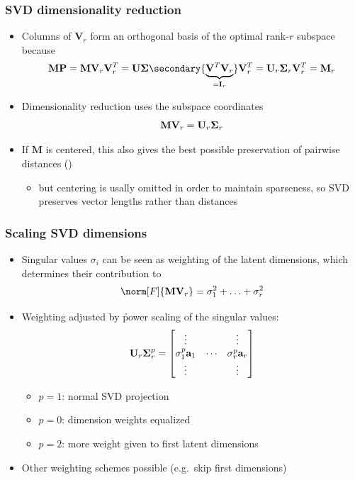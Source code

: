 \documentclass[t]{beamer} %
\begin{document}
\begin{frame}
  \frametitle{SVD dimensionality reduction}

  \begin{itemize}
  \item Columns of $\mathbf{V}_r$ form an orthogonal basis of the optimal rank-$r$ subspace because
    \[
      \mathbf{M} \mathbf{P} = \mathbf{M} \mathbf{V}_r \mathbf{V}_r^T
      = \mathbf{U} \Msigma \secondary{\underbrace{\mathbf{V}^T \mathbf{V}_r}_{= \mathbf{I}_r}} \mathbf{V}_r^T
      = \mathbf{U}_r \Msigma_r \mathbf{V}_r^T = \mathbf{M}_r
    \]
  \item<2-> \h{Dimensionality reduction} uses the subspace coordinates
    \[
      \mathbf{M} \mathbf{V}_r = \mathbf{U}_r \boldsymbol{\Sigma}_r
    \]
  \item<3-> If $\mathbf{M}$ is centered, this also gives the best possible
    preservation of pairwise distances \so {}
    ()
    \begin{itemize}
    \item[\hand] but centering is usally omitted in order to maintain sparseness,
      so SVD preserves vector lengths rather than distances
    \end{itemize}
  \end{itemize}
\end{frame}

\begin{frame}
  \frametitle{Scaling SVD dimensions}

  \begin{itemize}
  \item Singular values $\sigma_i$ can be seen as weighting of the latent
    dimensions, which determines their contribution to
    \[
      \norm[F]{\mathbf{M} \mathbf{V}_r} = \sigma_1^2 + \ldots + \sigma_r^2
    \]
  \item<2-> Weighting adjusted by \h{power scaling} of the singular values:
    \[
      \mathbf{U}_r \Msigma_r^p
      = \begin{bmatrix}
        \vdots &  & \vdots \\
        \sigma_1^p \va_1 & \cdots & \sigma_r^p \va_r \\
        \vdots &  & \vdots 
      \end{bmatrix}
    \]
    \ungap[1]
    \begin{itemize}
    \item $p = 1$: normal SVD projection
    \item $p = 0$: dimension weights equalized
    \item $p = 2$: more weight given to first latent dimensions
    \end{itemize}
  \item<2-> Other weighting schemes possible (e.g.\ skip first dimensions)
  \end{itemize}
\end{frame}
\end{document}
